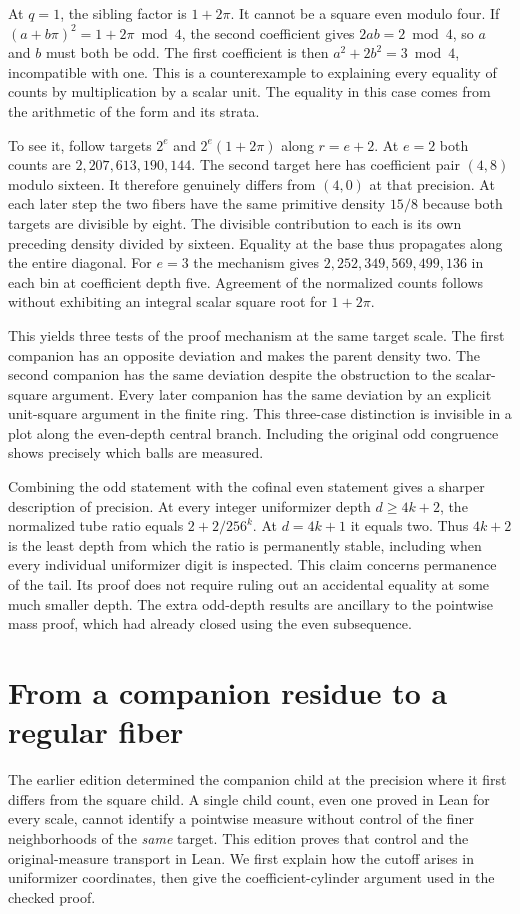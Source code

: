 \documentclass[12pt,letterpaper]{article}
\begin{document}
At $q=1$, the sibling factor is $1+2\pi$. It cannot be a square even modulo four. If $(a+b\pi)^2=1+2\pi\bmod4$, the second coefficient gives $2ab=2\bmod4$, so $a$ and $b$ must both be odd. The first coefficient is then $a^2+2b^2=3\bmod4$, incompatible with one. This is a counterexample to explaining every equality of counts by multiplication by a scalar unit. The equality in this case comes from the arithmetic of the form and its strata.

To see it, follow targets $2^e$ and $2^e(1+2\pi)$ along $r=e+2$. At $e=2$ both counts are $2{,}207{,}613{,}190{,}144$. The second target here has coefficient pair $(4,8)$ modulo sixteen. It therefore genuinely differs from $(4,0)$ at that precision. At each later step the two fibers have the same primitive density $15/8$ because both targets are divisible by eight. The divisible contribution to each is its own preceding density divided by sixteen. Equality at the base thus propagates along the entire diagonal. For $e=3$ the mechanism gives $2{,}252{,}349{,}569{,}499{,}136$ in each bin at coefficient depth five. Agreement of the normalized counts follows without exhibiting an integral scalar square root for $1+2\pi$.

This yields three tests of the proof mechanism at the same target scale. The first companion has an opposite deviation and makes the parent density two. The second companion has the same deviation despite the obstruction to the scalar-square argument. Every later companion has the same deviation by an explicit unit-square argument in the finite ring. This three-case distinction is invisible in a plot along the even-depth central branch. Including the original odd congruence shows precisely which balls are measured.

Combining the odd statement with the cofinal even statement gives a sharper description of precision. At every integer uniformizer depth $d\ge4k+2$, the normalized tube ratio equals $2+2/256^k$. At $d=4k+1$ it equals two. Thus $4k+2$ is the least depth from which the ratio is permanently stable, including when every individual uniformizer digit is inspected. This claim concerns permanence of the tail. Its proof does not require ruling out an accidental equality at some much smaller depth. The extra odd-depth results are ancillary to the pointwise mass proof, which had already closed using the even subsequence.

\section{From a companion residue to a regular fiber}
\label{sec:companion-fiber}
The earlier edition determined the companion child at the precision where it first differs from the square child. A single child count, even one proved in Lean for every scale, cannot identify a pointwise measure without control of the finer neighborhoods of the \emph{same} target. This edition proves that control and the original-measure transport in Lean. We first explain how the cutoff arises in uniformizer coordinates, then give the coefficient-cylinder argument used in the checked proof.
\end{document}
